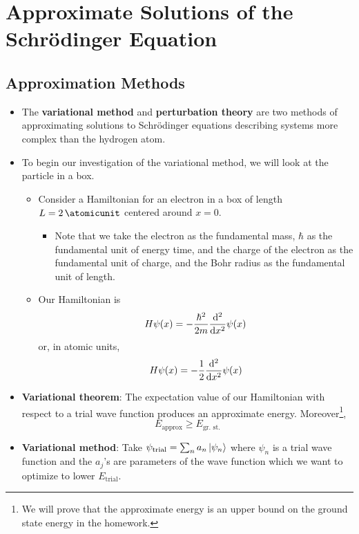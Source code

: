 \documentclass[../notes.tex]{subfiles}
\begin{document}
\chapter{Approximate Solutions of the Schr\"{o}dinger Equation}
\section{Approximation Methods}
\begin{itemize}
    \item {}The \textbf{variational method} and \textbf{perturbation theory} are two methods of approximating solutions to Schr\"{o}dinger equations describing systems more complex than the hydrogen atom.
    \item To begin our investigation of the variational method, we will look at the particle in a box.
    \begin{itemize}
        \item Consider a Hamiltonian for an electron in a box of length $L=\SI{2}{\atomicunit}$ centered around $x=0$.
        \begin{itemize}
            \item Note that we take the electron as the fundamental mass, $\hbar$ as the fundamental unit of energy time, and the charge of the electron as the fundamental unit of charge, and the Bohr radius as the fundamental unit of length.
        \end{itemize}
        \item Our Hamiltonian is
        \begin{equation*}
            H\psi(x) = -\frac{\hbar^2}{2m}\dv[2]{x}\psi(x)
        \end{equation*}
        or, in atomic units,
        \begin{equation*}
            H\psi(x) = -\frac{1}{2}\dv[2]{x}\psi(x)
        \end{equation*}
    \end{itemize}
    \item \textbf{Variational theorem}: The expectation value of our Hamiltonian with respect to a trial wave function produces an approximate energy. Moreover\footnote{We will prove that the approximate energy is an upper bound on the ground state energy in the homework.},
    \begin{equation*}
        E_\text{approx} \geq E_\text{gr. st.}
    \end{equation*}
    \item \textbf{Variational method}: Take $\psi_\text{trial}=\sum_na_n\ket{\psi_n}$ where $\psi_n$ is a trial wave function and the $a_j$'s are parameters of the wave function which we want to optimize to lower $E_\text{trial}$.

\end{itemize}
\end{document}
